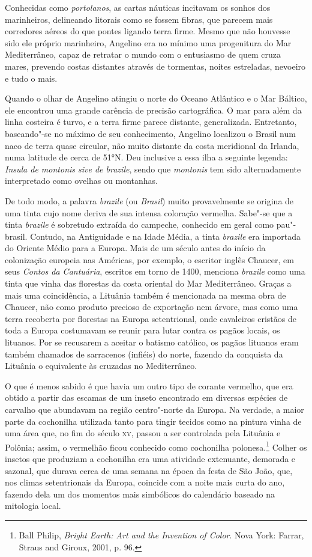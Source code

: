 Conhecidas como \textit{portolanos}, as cartas náuticas
incitavam os sonhos dos marinheiros, delineando litorais como se fossem
fibras, que parecem mais corredores aéreos do que pontes ligando terra
firme. Mesmo que não houvesse sido ele próprio marinheiro, Angelino era
no mínimo uma progenitura do Mar Mediterrâneo, capaz de retratar o mundo
com o entusiasmo de quem cruza mares, prevendo costas distantes através
de tormentas, noites estreladas, nevoeiro e tudo o mais. 

Quando o olhar
de Angelino atingiu o norte do Oceano Atlântico e o Mar Báltico, ele
encontrou uma grande carência de precisão cartográfica. O mar para além
da linha costeira é turvo, e a terra firme parece distante,
generalizada. Entretanto, baseando"-se no máximo de seu conhecimento,
Angelino localizou o Brasil num naco de terra quase circular, não muito
distante da costa meridional da Irlanda, numa latitude de cerca de 51°N.
Deu inclusive a essa ilha a seguinte legenda: \textit{Insula de montonis
sive de brazile}, sendo que \textit{montonis} tem sido alternadamente
interpretado como ovelhas ou montanhas.

De todo modo, a palavra \textit{brazile} (ou \textit{Brasil}) muito
provavelmente se origina de uma tinta cujo nome deriva de sua intensa
coloração vermelha. Sabe"-se que a tinta \textit{brazile} é sobretudo
extraída do campeche, conhecido em geral como pau"-brasil. Contudo, na
Antiguidade e na Idade Média, a tinta \textit{brazile} era importada do
Oriente Médio para a Europa. Mais de um século antes do início da
colonização europeia nas Américas, por exemplo, o escritor inglês
Chaucer, em seus \textit{Contos da Cantuária}, escritos em torno de 1400,
menciona \textit{brazile} como uma tinta que vinha das florestas da costa
oriental do Mar Mediterrâneo. Graças a mais uma coincidência, a Lituânia
também é mencionada na mesma obra de Chaucer, não como produto precioso
de exportação nem árvore, mas como uma terra recoberta por florestas na
Europa setentrional, onde cavaleiros cristãos de toda a Europa
costumavam se reunir para lutar contra os pagãos locais, os lituanos.
Por se recusarem a aceitar o batismo católico, os pagãos lituanos eram
também chamados de sarracenos (infiéis) do norte, fazendo da conquista
da Lituânia o equivalente às cruzadas no Mediterrâneo. 

O que é menos
sabido é que havia um outro tipo de corante vermelho, que era obtido a
partir das escamas de um inseto encontrado em diversas espécies de
carvalho que abundavam na região centro"-norte da Europa. Na verdade, a
maior parte da cochonilha utilizada tanto para tingir tecidos como na
pintura vinha de uma área que, no fim do século \textsc{xv}, passou a ser
controlada pela Lituânia e Polônia; assim, o vermelhão ficou conhecido
como cochonilha polonesa.\footnote{Ball Philip, \textit{Bright Earth:
  Art and the Invention of Color}. Nova York: Farrar, Straus and Giroux,
  2001, p. 96.} Colher os insetos que produziam a cochonilha era uma
atividade extenuante, demorada e sazonal, que durava cerca de uma semana
na época da festa de São João, que, nos climas setentrionais da Europa,
coincide com a noite mais curta do ano, fazendo dela um dos momentos
mais simbólicos do calendário baseado na mitologia local. 

